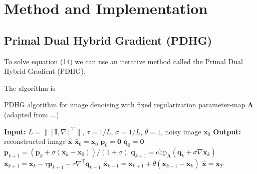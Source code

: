 \documentclass[12pt]{article}
\begin{document}
    
    
    




\section{Method and Implementation}



\subsection{Primal Dual Hybrid Gradient (PDHG)}

To solve equation
(14) 
we can use an iterative method called the Primal Dual Hybrid Gradient (PDHG). 

The algorithm is

\begin{algorithm}[H]
\caption{PDHG algorithm for image denoising with fixed regularization parameter-map $\boldsymbol{\Lambda}$ (adapted from ...)}
\begin{algorithmic}[1]
\STATE \textbf{Input:} $L = \| [\mathbf{I}, \nabla]^\text{T} \|$, $\tau = 1/L$, $\sigma = 1/L$, $\theta = 1$, noisy image $\mathbf{x}_0$
\STATE \textbf{Output:} reconstructed image $\hat{\mathbf{x}}$
\STATE $\bar{\mathbf{x}}_0 = \mathbf{x}_0$
\STATE $\mathbf{p}_0 = \mathbf{0}$
\STATE $\mathbf{q}_0 = \mathbf{0}$
    \STATE $\mathbf{p}_{k+1} = \left(\mathbf{p}_k + \sigma ( \bar{\mathbf{x}}_k - \mathbf{x}_0)\right) / (1 + \sigma)$
    \STATE $\mathbf{q}_{k+1} = \text{clip}_{\boldsymbol{\Lambda}} \left(\mathbf{q}_k + \sigma \nabla \bar{\mathbf{x}}_k \right)$
    \STATE $\mathbf{x}_{k+1} = \mathbf{x}_k - \tau \mathbf{p}_{k+1} - \tau \nabla^\text{T} \mathbf{q}_{k+1}$
    \STATE $\bar{\mathbf{x}}_{k+1} = \mathbf{x}_{k+1} + \theta (\mathbf{x}_{k+1} - \mathbf{x}_k)$
\ENDFOR
\STATE $\hat{\mathbf{x}} = \mathbf{x}_T$
\end{algorithmic}
\end{algorithm}
\end{document}
